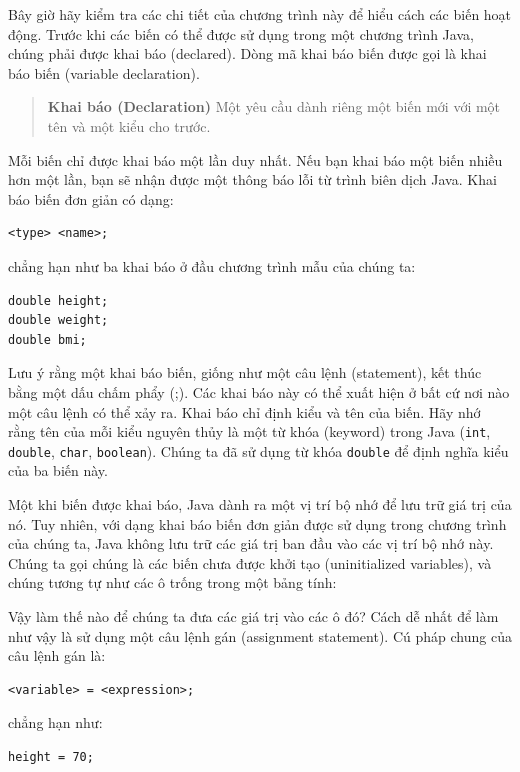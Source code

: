 Bây giờ hãy kiểm tra các chi tiết của chương trình này để hiểu cách các
biến hoạt động. Trước khi các biến có thể được sử dụng trong một chương
trình Java, chúng phải được khai báo (declared). Dòng mã khai báo biến
được gọi là khai báo biến (variable declaration).

\begin{quote}
\textbf{Khai báo (Declaration)} Một yêu cầu dành riêng một biến mới với
một tên và một kiểu cho trước.
\end{quote}

Mỗi biến chỉ được khai báo một lần duy nhất. Nếu bạn khai báo một biến
nhiều hơn một lần, bạn sẽ nhận được một thông báo lỗi từ trình biên dịch
Java. Khai báo biến đơn giản có dạng:

\begin{verbatim}
<type> <name>;
\end{verbatim}

chẳng hạn như ba khai báo ở đầu chương trình mẫu của chúng ta:

\begin{verbatim}
double height;
double weight;
double bmi;
\end{verbatim}

Lưu ý rằng một khai báo biến, giống như một câu lệnh (statement), kết
thúc bằng một dấu chấm phẩy (;). Các khai báo này có thể xuất hiện ở bất
cứ nơi nào một câu lệnh có thể xảy ra. Khai báo chỉ định kiểu và tên của
biến. Hãy nhớ rằng tên của mỗi kiểu nguyên thủy là một từ khóa (keyword)
trong Java (\texttt{int}, \texttt{double}, \texttt{char},
\texttt{boolean}). Chúng ta đã sử dụng từ khóa \texttt{double} để định
nghĩa kiểu của ba biến này.

Một khi biến được khai báo, Java dành ra một vị trí bộ nhớ để lưu trữ
giá trị của nó. Tuy nhiên, với dạng khai báo biến đơn giản được sử dụng
trong chương trình của chúng ta, Java không lưu trữ các giá trị ban đầu
vào các vị trí bộ nhớ này. Chúng ta gọi chúng là các biến chưa được khởi
tạo (uninitialized variables), và chúng tương tự như các ô trống trong
một bảng tính:

Vậy làm thế nào để chúng ta đưa các giá trị vào các ô đó? Cách dễ nhất
để làm như vậy là sử dụng một câu lệnh gán (assignment statement). Cú
pháp chung của câu lệnh gán là:

\begin{verbatim}
<variable> = <expression>;
\end{verbatim}

chẳng hạn như:

\begin{verbatim}
height = 70;
\end{verbatim}

